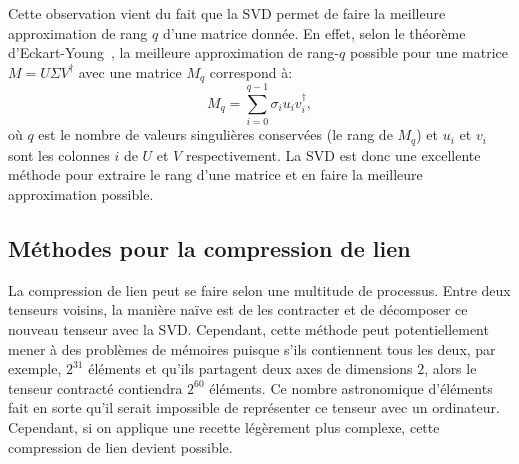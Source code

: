 Cette observation vient du fait que la SVD permet de faire la meilleure approximation de rang $q$ d'une matrice donnée.
En effet, selon le théorème d'Eckart-Young~\cite{eckart_approximation_1936, dax2014low}, la meilleure approximation de rang-$q$ possible pour une matrice $M = U \Sigma V^\dagger$ avec une matrice $M_q$ correspond à:
\begin{equation}\label{eq:eckart-young}
    M_q = \sum_{i=0}^{q-1}\sigma_i u_i v^\dagger_i,
\end{equation}
où $q$ est le nombre de valeurs singulières conservées (le rang de $M_q$) et $u_i$ et $v_i$ sont les colonnes $i$ de $U$ et $V$ respectivement.
La SVD est donc une excellente méthode pour extraire le rang d'une matrice et en faire la meilleure approximation possible.

\subsection{Méthodes pour la compression de lien}\label{subsec:bond-compression}
La compression de lien peut se faire selon une multitude de processus.
Entre deux tenseurs voisins, la manière naïve est de les contracter et de décomposer ce nouveau tenseur avec la SVD.
Cependant, cette méthode peut potentiellement mener à des problèmes de mémoires puisque s'ils contiennent tous les deux, par exemple, $2^{31}$ éléments et qu'ils partagent deux axes de dimensions $2$, alors le tenseur contracté contiendra $2^{60}$ éléments.
Ce nombre astronomique d'éléments fait en sorte qu'il serait impossible de représenter ce tenseur avec un ordinateur.
Cependant, si on applique une recette légèrement plus complexe, cette compression de lien devient possible.

